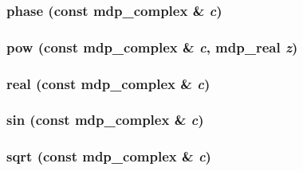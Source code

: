 \label{classmdp__complex_a9dbd08dfce91bbc62f7e1b2926a63dcd}
\hypertarget{classmdp__complex_a54c5a00e1f1f36c105a4587431fd2dab}{
\subsubsection[{phase}]{ phase (const {\bf mdp\_\-complex} \& {\em c})}}
\label{classmdp__complex_a54c5a00e1f1f36c105a4587431fd2dab}
\hypertarget{classmdp__complex_ab20fc6334d41fa698d4ab5c4d83386b7}{
\subsubsection[{pow}]{ pow (const {\bf mdp\_\-complex} \& {\em c}, \/  {\bf mdp\_\-real} {\em z})}}
\label{classmdp__complex_ab20fc6334d41fa698d4ab5c4d83386b7}
\hypertarget{classmdp__complex_ac1595428e446b7ae72e170eabfd8b94f}{
\subsubsection[{real}]{ real (const {\bf mdp\_\-complex} \& {\em c})}}
\label{classmdp__complex_ac1595428e446b7ae72e170eabfd8b94f}
\hypertarget{classmdp__complex_ab01054c3b4d1c10d13833c8d069a09f6}{
\subsubsection[{sin}]{ sin (const {\bf mdp\_\-complex} \& {\em c})}}
\label{classmdp__complex_ab01054c3b4d1c10d13833c8d069a09f6}
\hypertarget{classmdp__complex_ab967861ba5a992ba73f0aad6e6a80def}{
\subsubsection[{sqrt}]{ sqrt (const {\bf mdp\_\-complex} \& {\em c})}}
